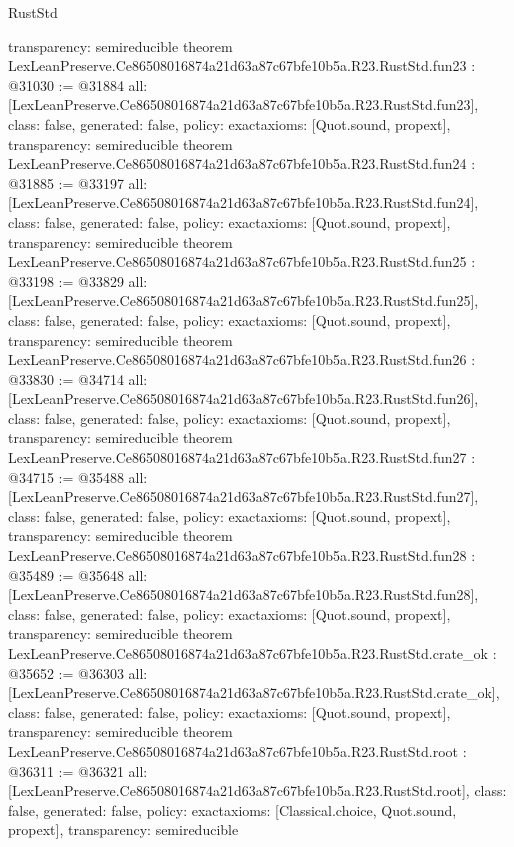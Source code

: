 \begin{lexlean}{RustStd}
\begin{coremodule}
{  transparency: semireducible
}
theorem LexLeanPreserve.Ce86508016874a21d63a87c67bfe10b5a.R23.RustStd.fun23 : @31030 := @31884 {
  all: [LexLeanPreserve.Ce86508016874a21d63a87c67bfe10b5a.R23.RustStd.fun23],
  class: false,
  generated: false,
  policy: exact{axioms: [Quot.sound, propext]},
  transparency: semireducible
}
theorem LexLeanPreserve.Ce86508016874a21d63a87c67bfe10b5a.R23.RustStd.fun24 : @31885 := @33197 {
  all: [LexLeanPreserve.Ce86508016874a21d63a87c67bfe10b5a.R23.RustStd.fun24],
  class: false,
  generated: false,
  policy: exact{axioms: [Quot.sound, propext]},
  transparency: semireducible
}
theorem LexLeanPreserve.Ce86508016874a21d63a87c67bfe10b5a.R23.RustStd.fun25 : @33198 := @33829 {
  all: [LexLeanPreserve.Ce86508016874a21d63a87c67bfe10b5a.R23.RustStd.fun25],
  class: false,
  generated: false,
  policy: exact{axioms: [Quot.sound, propext]},
  transparency: semireducible
}
theorem LexLeanPreserve.Ce86508016874a21d63a87c67bfe10b5a.R23.RustStd.fun26 : @33830 := @34714 {
  all: [LexLeanPreserve.Ce86508016874a21d63a87c67bfe10b5a.R23.RustStd.fun26],
  class: false,
  generated: false,
  policy: exact{axioms: [Quot.sound, propext]},
  transparency: semireducible
}
theorem LexLeanPreserve.Ce86508016874a21d63a87c67bfe10b5a.R23.RustStd.fun27 : @34715 := @35488 {
  all: [LexLeanPreserve.Ce86508016874a21d63a87c67bfe10b5a.R23.RustStd.fun27],
  class: false,
  generated: false,
  policy: exact{axioms: [Quot.sound, propext]},
  transparency: semireducible
}
theorem LexLeanPreserve.Ce86508016874a21d63a87c67bfe10b5a.R23.RustStd.fun28 : @35489 := @35648 {
  all: [LexLeanPreserve.Ce86508016874a21d63a87c67bfe10b5a.R23.RustStd.fun28],
  class: false,
  generated: false,
  policy: exact{axioms: [Quot.sound, propext]},
  transparency: semireducible
}
theorem LexLeanPreserve.Ce86508016874a21d63a87c67bfe10b5a.R23.RustStd.crate_ok : @35652 := @36303 {
  all: [LexLeanPreserve.Ce86508016874a21d63a87c67bfe10b5a.R23.RustStd.crate_ok],
  class: false,
  generated: false,
  policy: exact{axioms: [Quot.sound, propext]},
  transparency: semireducible
}
theorem LexLeanPreserve.Ce86508016874a21d63a87c67bfe10b5a.R23.RustStd.root : @36311 := @36321 {
  all: [LexLeanPreserve.Ce86508016874a21d63a87c67bfe10b5a.R23.RustStd.root],
  class: false,
  generated: false,
  policy: exact{axioms: [Classical.choice, Quot.sound, propext]},
  transparency: semireducible
}


\end{coremodule}
\end{lexlean}
